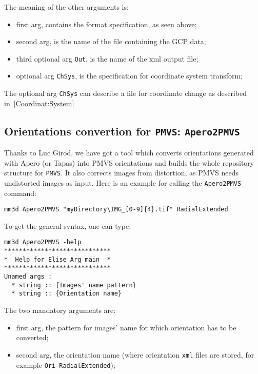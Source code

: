 \vspace{\baselineskip}
The meaning of the other arguments is:

\begin{itemize}
    \item first arg, contains the format specification, as seen above;
    \item second arg, is the name of the file containing the GCP data;
    \item third optional arg {\tt Out}, is the name of the xml output file;
    \item optional arg {\tt ChSys}, is the specification for coordinate system transform; 
\end{itemize}
\vspace{\baselineskip}
The optional arg {\tt ChSys} can describe a file for coordinate change as described in~\ref{Coordinat:System}


\subsection{Orientations convertion for {\tt PMVS}: {\tt Apero2PMVS} }

Thanks to Luc Girod, we have got a tool which converts orientations generated with Apero (or Tapas) into PMVS orientations and builds the whole repository structure for {\tt PMVS}.
It also corrects images from distortion, as PMVS needs undistorted images as input.
Here is an example for calling the {\tt Apero2PMVS} command:

\begin{verbatim}
mm3d Apero2PMVS "myDirectory\IMG_[0-9]{4}.tif" RadialExtended
\end{verbatim}

To get the general syntax, one can type:

\begin{verbatim}
mm3d Apero2PMVS -help
*****************************
*  Help for Elise Arg main  *
*****************************
Unamed args :
  * string :: {Images' name pattern}
  * string :: {Orientation name}
\end{verbatim}

The two mandatory arguments are:
\begin{itemize}
    \item first arg, the pattern for images' name for which orientation has to be converted;
    \item second arg, the orientation name (where orientation {\tt xml} files are stored, for example {\tt Ori-RadialExtended});
\end{itemize}

